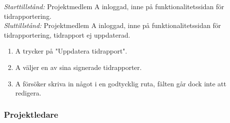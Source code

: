 \documentclass[a4paper]{article}
\begin{document}
\begin{FT}
\emph{Starttillstånd:} Projektmedlem A inloggad, inne på funktionalitetssidan för tidrapportering.\\
\emph{Sluttillstånd:} Projektmedlem A inloggad, inne på funktionalitetssidan för tidrapportering, tidrapport ej uppdaterad.

\begin{enumerate}
\item A trycker på "Uppdatera tidrapport".
\item A väljer en av sina signerade tidrapporter.
\item A försöker skriva in något i en godtycklig ruta, fälten går dock inte att redigera.
\end{enumerate}

\end{FT}

\subsubsection{Projektledare}
\end{document}

